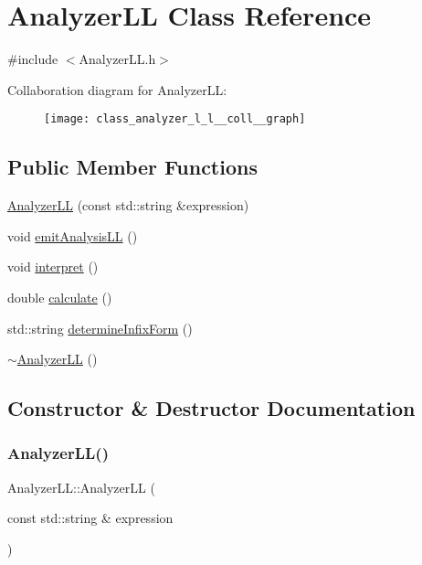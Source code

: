 \hypertarget{class_analyzer_l_l}{}\section{Analyzer\+LL Class Reference}
\label{class_analyzer_l_l}


{\ttfamily \#include $<$Analyzer\+L\+L.\+h$>$}



Collaboration diagram for Analyzer\+LL\+:
\nopagebreak
\begin{figure}[H]
\begin{center}
\leavevmode
\texttt{[image: class\_analyzer\_l\_l\_\_coll\_\_graph]}
\end{center}
\end{figure}
\subsection*{Public Member Functions}
\begin{DoxyCompactItemize}
\item 
\mbox{\hyperlink{class_analyzer_l_l_a02b5d9eb104c8bcbb5fcfe8666e2025a}{Analyzer\+LL}} (const std\+::string \&expression)
\item 
void \mbox{\hyperlink{class_analyzer_l_l_ae5196d3b6fa7c77e476757e0bc933472}{emit\+Analysis\+LL}} ()
\item 
void \mbox{\hyperlink{class_analyzer_l_l_ae2835c37162eddf5892b4955253a001d}{interpret}} ()
\item 
double \mbox{\hyperlink{class_analyzer_l_l_a4f5f190b1a6194b86514db394ce0821d}{calculate}} ()
\item 
std\+::string \mbox{\hyperlink{class_analyzer_l_l_a9a6ea6332fd95d472c49238ab1cba239}{determine\+Infix\+Form}} ()
\item 
\mbox{\hyperlink{class_analyzer_l_l_a4b5230af9d7ddc5a7f1b05d1d9b1b9d0}{$\sim$\+Analyzer\+LL}} ()
\end{DoxyCompactItemize}


\subsection{Constructor \& Destructor Documentation}
\mbox{\label{class_analyzer_l_l_a02b5d9eb104c8bcbb5fcfe8666e2025a}} 
\subsubsection{\texorpdfstring{AnalyzerLL()}{AnalyzerLL()}}
{\footnotesize\ttfamily Analyzer\+L\+L\+::\+Analyzer\+LL (\begin{DoxyParamCaption}\item[{const std\+::string \&}]{expression }\end{DoxyParamCaption})}

